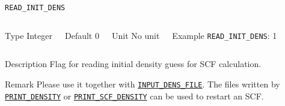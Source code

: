     
    \begin{frame}[allowframebreaks]{\texttt{READ\_INIT\_DENS}} \label{READ_INIT_DENS}
    \vspace*{-12pt}
    \begin{columns}
    \begin{block}{Type}
    Integer
    \end{block}
    
    \begin{block}{Default}
    0
    \end{block}
    
    \begin{block}{Unit}
    No unit
    \end{block}
    
    \begin{block}{Example}
    \texttt{READ\_INIT\_DENS}: 1
    \end{block}
    \end{columns}
    
    \begin{block}{Description}
    Flag for reading initial density guess for SCF calculation. 
    \end{block}
    
    \begin{block}{Remark}
    Please use it together with \hyperlink{INPUT_DENS_FILE}{\texttt{INPUT\_DENS\_FILE}}. The files written by \hyperlink{PRINT_DENSITY}{\texttt{PRINT\_DENSITY}} or \hyperlink{PRINT_SCF_DENSITY}{\texttt{PRINT\_SCF\_DENSITY}} can be used to restart an SCF.
    \end{block}
    
    \end{frame}
        